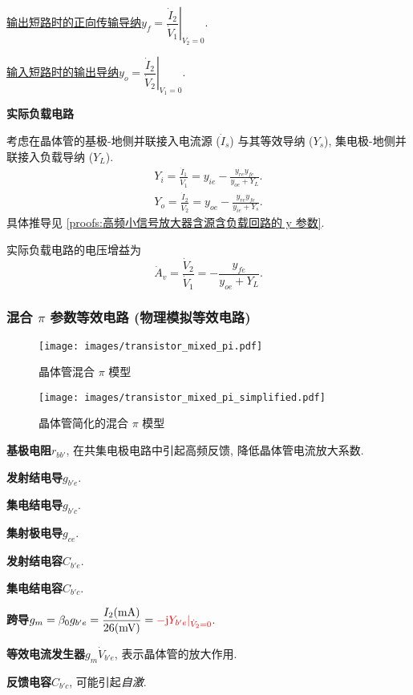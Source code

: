 \underline{输出短路时的正向传输导纳}\quad $y_f=\left.\dfrac{\dot{I}_2}{\dot{V}_1}\right|_{V_2=0}$.

\underline{输入短路时的输出导纳}\quad $y_o=\left.\dfrac{\dot{I}_2}{\dot{V}_2}\right|_{V_1=0}$.

\textbf{实际负载电路}

考虑在晶体管的基极-地侧并联接入电流源 ($\dot{I}_s$) 与其等效导纳 ($Y_s$), 集电极-地侧并联接入负载导纳 ($Y_L$).
\begin{gather}
    Y_i=\frac{\dot{I}_1}{\dot{V}_1}=y_{ie}-\frac{y_{re}y_{fe}}{y_{oe}+Y_L}. \label{eq:3.2 y Yi} \\
    Y_o=\frac{\dot{I}_2}{\dot{V}_2}=y_{oe}-\frac{y_{re}y_{fe}}{y_{ie}+Y_s}. \label{eq:3.2 y Yo}
\end{gather}
具体推导见 \ref{proofs:高频小信号放大器含源含负载回路的 y 参数}.

实际负载电路的电压增益为
\begin{equation}
    \dot{A}_v=\frac{\dot{V}_2}{\dot{V}_1}=-\frac{y_{fe}}{y_{oe}+Y_L}.
\end{equation}

\subsubsection{混合 \texorpdfstring{$\pi$}{pi} 参数等效电路 (物理模拟等效电路)}

\begin{figure}[H]
    \centering
    \begin{minipage}{.504\textwidth}
        \centering
        \texttt{[image: images/transistor\_mixed\_pi.pdf]}
        \caption{晶体管混合 \texorpdfstring{$\pi$}{pi} 模型}
    \end{minipage}
    \begin{minipage}{.396\textwidth}
        \centering
        \texttt{[image: images/transistor\_mixed\_pi\_simplified.pdf]}
        \caption{晶体管简化的混合 \texorpdfstring{$\pi$}{pi} 模型}
        \label{fig:3.2 transistor mixed pi simplified}
    \end{minipage}
\end{figure}

\textbf{基极电阻}\quad $r_{bb'}$, 在共集电极电路中引起高频反馈, 降低晶体管电流放大系数. \par
\textbf{发射结电导}\quad $g_{b'e}$. \par
\textbf{集电结电导}\quad $g_{b'c}$. \par
\textbf{集射极电导}\quad $g_{ce}$. \par
\textbf{发射结电容}\quad $C_{b'e}$. \par
\textbf{集电结电容}\quad $C_{b'c}$. \par
\textbf{跨导}\quad $g_m=\beta_0 g_{b'e}=\dfrac{I_2(\mathrm{mA})}{26(\mathrm{mV})}={\color{red} -\mathrm{j}Y_{b'e}|_{\dot{V}_2=0}}$. \par
\textbf{等效电流发生器}\quad $g_m\dot{V}_{b'e}$, 表示晶体管的放大作用. \par
\textbf{反馈电容}\quad $C_{b'c}$, 可能引起\textit{自激}.

